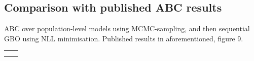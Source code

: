 \documentclass[mphil,deptreport,ianc]{infthesis} %
\begin{document}
\subsection{Comparison with published ABC results}

\cite{Rene2020} ABC over population-level models using MCMC-sampling, and then sequential GBO using NLL minimisation.
Published results in aforementioned, figure 9.


\begin{tabular}{c|c}
     &  \\
     & 
\end{tabular}





\end{document}
